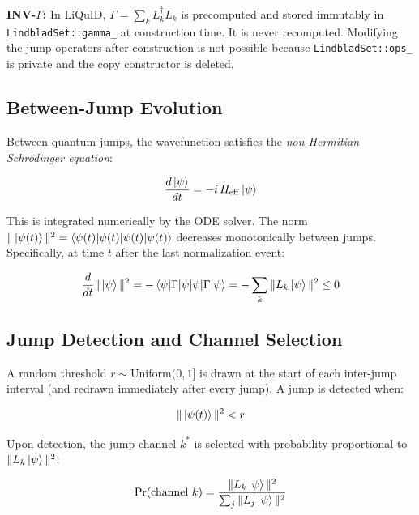 \documentclass[11pt,a4paper,twoside]{book}
\newcommand{\Heff}{H_{\mathrm{eff}}}
\newcommand{\code}[1]{\texttt{\small#1}}
\theoremstyle{definition}
\theoremstyle{remark}
\begin{document}
\begin{invbox}
  \textbf{INV-$\Gamma$:} In LiQuID, $\Gamma = \sum_k L_k^\dagger L_k$ is
  precomputed and stored immutably in \code{LindbladSet::gamma\_} at
  construction time. It is never recomputed. Modifying the jump operators
  after construction is not possible because \code{LindbladSet::ops\_}
  is private and the copy constructor is deleted.
\end{invbox}

\subsection{Between-Jump Evolution}
\label{subsec:between-jump}

Between quantum jumps, the wavefunction satisfies the
\emph{non-Hermitian Schr{\"o}dinger equation}:

\begin{equation}
  \frac{d\ket{\psi}}{dt} = -i\,\Heff\ket{\psi}
  \label{eq:nhse}
\end{equation}

This is integrated numerically by the ODE solver.
The norm $\|\ket{\psi(t)}\|^2 = \braket{\psi(t)|\psi(t)}$ decreases
monotonically between jumps. Specifically, at time $t$ after the last
normalization event:

\begin{equation}
  \frac{d}{dt}\|\ket{\psi}\|^2
    = -\braket{\psi|\Gamma|\psi}
    = -\sum_k \|L_k\ket{\psi}\|^2 \leq 0
  \label{eq:norm-decay}
\end{equation}

\subsection{Jump Detection and Channel Selection}
\label{subsec:jump-detection}

A random threshold $r \sim \mathrm{Uniform}(0, 1]$ is drawn at the
start of each inter-jump interval (and redrawn immediately after every
jump). A jump is detected when:

\begin{equation}
  \|\ket{\psi(t)}\|^2 < r
  \label{eq:jump-detect}
\end{equation}

Upon detection, the jump channel $k^*$ is selected with probability
proportional to $\|L_k\ket{\psi}\|^2$:

\begin{equation}
  \Pr(\text{channel } k) = \frac{\|L_k\ket{\psi}\|^2}{\sum_{j}\|L_j\ket{\psi}\|^2}
  \label{eq:jump-prob}
\end{equation}
\end{document}
